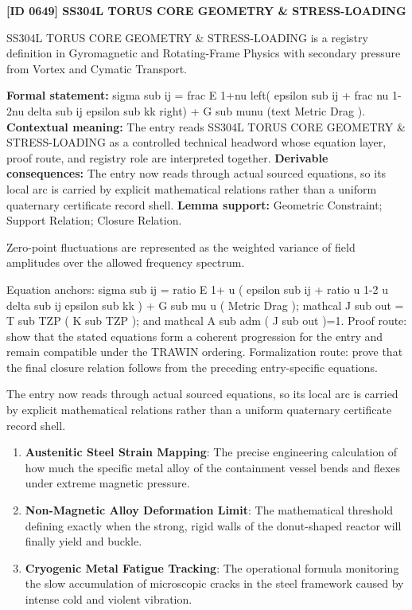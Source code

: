 \clearpage
\noindent\textbf{[ID 0649] SS304L TORUS CORE GEOMETRY \& STRESS-LOADING}\par
\vspace{0.35em}
\begingroup\small
{}
SS304L TORUS CORE GEOMETRY \& STRESS-LOADING is a registry definition in Gyromagnetic and Rotating-Frame Physics with secondary pressure from Vortex and Cymatic Transport.

\begingroup\footnotesize\setlength{\emergencystretch}{3em}\sloppy
\textbf{Formal statement:} sigma sub ij = frac E 1+nu left( epsilon sub ij + frac nu 1-2nu delta sub ij epsilon sub kk right) + G sub munu (text Metric Drag ). \textbf{Contextual meaning:} The entry reads SS304L TORUS CORE GEOMETRY \& STRESS-LOADING as a controlled technical headword whose equation layer, proof route, and registry role are interpreted together. \textbf{Derivable consequences:} The entry now reads through actual sourced equations, so its local arc is carried by explicit mathematical relations rather than a uniform quaternary certificate record shell. \textbf{Lemma support:} Geometric Constraint; Support Relation; Closure Relation.\par
\endgroup

Zero-point fluctuations are represented as the weighted variance of field amplitudes over the allowed frequency spectrum.

Equation anchors: sigma sub ij = ratio E 1+ u ( epsilon sub ij + ratio u 1-2 u delta sub ij epsilon sub kk ) + G sub mu u ( Metric Drag ); mathcal J sub out = T sub TZP ( K sub TZP ); and mathcal A sub adm ( J sub out )=1. Proof route: show that the stated equations form a coherent progression for the entry and remain compatible under the TRAWIN ordering. Formalization route: prove that the final closure relation follows from the preceding entry-specific equations.

The entry now reads through actual sourced equations, so its local arc is carried by explicit mathematical relations rather than a uniform quaternary certificate record shell.
\endgroup

\begin{enumerate}[leftmargin=1.6em,itemsep=6pt,topsep=4pt]
\item \textbf{Austenitic Steel Strain Mapping}: The precise engineering calculation of how much the specific metal alloy of the containment vessel bends and flexes under extreme magnetic pressure.
\item \textbf{Non-Magnetic Alloy Deformation Limit}: The mathematical threshold defining exactly when the strong, rigid walls of the donut-shaped reactor will finally yield and buckle.
\item \textbf{Cryogenic Metal Fatigue Tracking}: The operational formula monitoring the slow accumulation of microscopic cracks in the steel framework caused by intense cold and violent vibration.
\end{enumerate}

